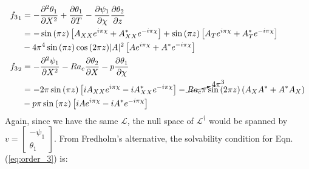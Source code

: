 \documentclass{article}
\newcommand{\pd}[2]{\frac{\partial{#1}}{\partial{#2}}}
\newcommand{\pdd}[2]{\frac{\partial^2{#1}}{\partial{#2}^2}}
\begin{document}
\begin{align}
 \begin{split}
  {f_{3}}_{1} &= - \pdd{\theta_{1}}{X} + \pd{\theta_{1}}{T} - \pd{\psi_{1}}{\chi}\pd{\theta_{2}}{z} \\
  &= -\sin{(\pi z)} \left[A_{XX} e^{i \pi \chi} + A^{*}_{XX} e^{-i \pi \chi} \right] + \sin{(\pi z)} \left[A_{T} e^{i \pi \chi} + A^{*}_{T} e^{-i \pi \chi} \right] \\
  &- 4\pi^{4}\sin{(\pi z)}\cos{(2 \pi z)} |A|^{2}\left[A e^{i \pi \chi} + A^{*} e^{-i \pi \chi} \right]\\
  {f_{3}}_{2} &= - \pdd{\psi_{1}}{X} - Ra_{c}\pd{\theta_{2}}{X} - p \pd{\theta_{1}}{\chi}\\
  &= -2 \pi \sin{(\pi z)}\left[i A_{XX} e^{i \pi \chi} - i A^{*}_{XX} e^{-i \pi \chi} \right] - \cancelto{4\pi^{3}}{Ra_{c}\pi} \sin{(2 \pi z)} \left(A_{X}A^{*} + A^{*} A_{X}\right)\\
  &-p\pi \sin{(\pi z)}\left[i A e^{i \pi \chi} - i A^{*} e^{-i \pi \chi} \right]
 \end{split}
\end{align}
Again, since we have the same $\mathcal{L}$, the null space of $\mathcal{L}^{\dagger}$ would be spanned by $v = \begin{bmatrix}
-\psi_{1}\\                                                                                                                                                                                                                                                                                                                                  
\theta_{1}                                                                                                                                                                                                                                                                                                                               \end{bmatrix}$. From Fredholm's alternative, the solvability condition for Eqn.(\ref{eq:order_3}) is:
\end{document}
